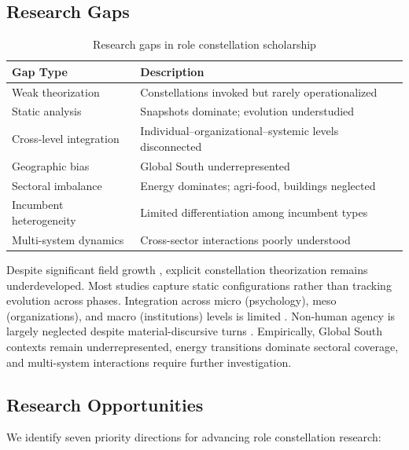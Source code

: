 \subsection{Research Gaps}

\begin{table}[htbp]
\centering
\small
\caption{Research gaps in role constellation scholarship}
\label{tab:gaps}
\begin{tabular}{@{}p{2.8cm}p{5.2cm}@{}}
\toprule
\textbf{Gap Type} & \textbf{Description} \\
\midrule
Weak theorization & Constellations invoked but rarely operationalized \\
Static analysis & Snapshots dominate; evolution understudied \\
Cross-level integration & Individual--organizational--systemic levels disconnected \\
Geographic bias & Global South underrepresented \\
Sectoral imbalance & Energy dominates; agri-food, buildings neglected \\
Incumbent heterogeneity & Limited differentiation among incumbent types \\
Multi-system dynamics & Cross-sector interactions poorly understood \\
\bottomrule
\end{tabular}
\end{table}

Despite significant field growth \citep{kohler2019agenda}, explicit constellation theorization remains underdeveloped. Most studies capture static configurations rather than tracking evolution across phases. Integration across micro (psychology), meso (organizations), and macro (institutions) levels is limited \citep{upham2019thinking}. Non-human agency is largely neglected despite material-discursive turns \citep{contesse2021unravelling}. Empirically, Global South contexts remain underrepresented, energy transitions dominate sectoral coverage, and multi-system interactions require further investigation.

\subsection{Research Opportunities}

We identify seven priority directions for advancing role constellation research:

